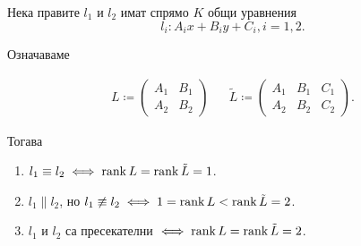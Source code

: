 \documentclass{../../common/topic}
\begin{document}
\begin{theorem}
  Нека правите \( l_1 \) и \( l_2 \) имат спрямо \( K \) общи уравнения
  \begin{equation}\label{thm:plane_line_position/scalar_equations}
    l_i : A_i x + B_i y + C_i, i = 1, 2.
  \end{equation}

  Означаваме

  \begin{align*}
    L \coloneqq \begin{pmatrix}
      A_1 & B_1 \\
      A_2 & B_2
    \end{pmatrix}
    &&
    \tilde L \coloneqq \begin{pmatrix}
      A_1 & B_1 & C_1 \\
      A_2 & B_2 & C_2
    \end{pmatrix}.
  \end{align*}

  Тогава
  \begin{enumerate}
    \item \( l_1 \equiv l_2 \iff \operatorname{rank} L = \operatorname{rank} \tilde L = 1 \).
    \item \( l_1 \parallel l_2 \), но \( l_1 \not\equiv l_2 \iff 1 = \operatorname{rank} L < \operatorname{rank} \tilde L = 2 \).
    \item \( l_1 \) и \( l_2 \) са пресекателни \( \iff \operatorname{rank} L = \operatorname{rank} \tilde L = 2 \).
  \end{enumerate}
\end{theorem}
\end{document}
